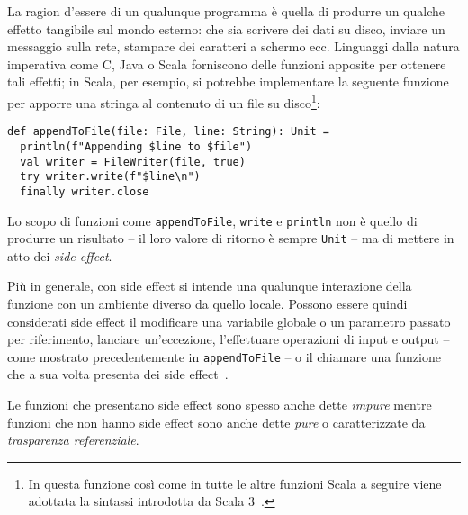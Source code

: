 La ragion d'essere di un qualunque programma è quella di produrre un qualche effetto tangibile sul mondo esterno: che sia scrivere dei dati su disco, inviare un messaggio sulla rete, stampare dei caratteri a schermo ecc.
Linguaggi dalla natura imperativa come C, Java o Scala forniscono delle funzioni apposite per ottenere tali effetti; in Scala, per esempio, si potrebbe implementare la seguente funzione per apporre una stringa al contenuto di un file su disco\footnote{In questa funzione così come in tutte le altre funzioni Scala a seguire viene adottata la sintassi introdotta da Scala 3~\cite{cit:new-in-scala-3}.}:

\begin{lstlisting}[language=scala3]
def appendToFile(file: File, line: String): Unit =
  println(f"Appending $line to $file")
  val writer = FileWriter(file, true)
  try writer.write(f"$line\n")
  finally writer.close
\end{lstlisting}
Lo scopo di funzioni come \lstinline{appendToFile}, \lstinline{write} e \lstinline{println} non è quello di produrre un risultato -- il loro valore di ritorno è sempre \lstinline{Unit} -- ma di mettere in atto dei \emph{side effect}.

Più in generale, con side effect si intende una qualunque interazione della funzione con un ambiente diverso da quello locale.
Possono essere quindi considerati side effect il modificare una variabile globale o un parametro passato per riferimento, lanciare un'eccezione, l'effettuare operazioni di input e output -- come mostrato precedentemente in \lstinline{appendToFile} -- o il chiamare una funzione che a sua volta presenta dei side effect~\cite{cit:on-the-prevalence-of-function-side-effects-in-general-purpose-open-source-software-systems}.

Le funzioni che presentano side effect sono spesso anche dette \emph{impure} mentre funzioni che non hanno side effect sono anche dette \emph{pure} o caratterizzate da \emph{trasparenza referenziale}.